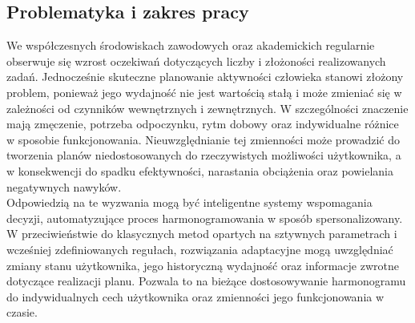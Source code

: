 \subsection{Problematyka i zakres pracy}\label{section_problem}

\quad We współczesnych środowiskach zawodowych oraz akademickich regularnie obserwuje się wzrost oczekiwań dotyczących liczby i złożoności realizowanych zadań. Jednocześnie skuteczne planowanie aktywności człowieka stanowi złożony problem, ponieważ jego wydajność nie jest wartością stałą i może zmieniać się w zależności od czynników wewnętrznych i zewnętrznych. W szczególności znaczenie mają zmęczenie, potrzeba odpoczynku, rytm dobowy oraz indywidualne różnice w sposobie funkcjonowania. Nieuwzględnianie tej zmienności może prowadzić do tworzenia planów niedostosowanych do rzeczywistych możliwości użytkownika, a w konsekwencji do spadku efektywności, narastania obciążenia oraz powielania negatywnych nawyków.
\\\indent Odpowiedzią na te wyzwania mogą być inteligentne systemy wspomagania decyzji, automatyzujące proces harmonogramowania w sposób spersonalizowany. W przeciwieństwie do klasycznych metod opartych na sztywnych parametrach i wcześniej zdefiniowanych regułach, rozwiązania adaptacyjne mogą uwzględniać zmiany stanu użytkownika, jego historyczną wydajność oraz informacje zwrotne dotyczące realizacji planu. Pozwala to na bieżące dostosowywanie harmonogramu do indywidualnych cech użytkownika oraz zmienności jego funkcjonowania w czasie.
